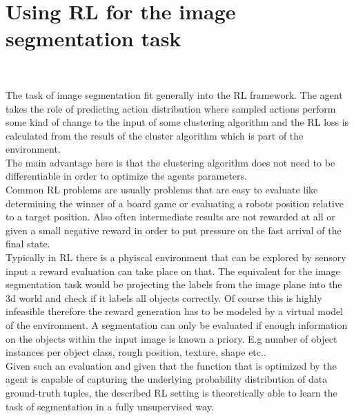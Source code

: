 \section{Using RL for the image segmentation task}~\label{sec:rl_for_seg}

The task of image segmentation fit generally into the RL framework. The agent takes the role of predicting action distribution where sampled actions perform some kind of change to the input of some clustering algorithm and the RL loss is calculated from the result of the cluster algorithm which is part of the environment. \\
The main advantage here is that the clustering algorithm does not need to be differentiable in order to optimize the agents parameters.\\
Common RL problems are usually problems that are easy to evaluate like determining the winner of a board game or evaluating a robots position relative to a target position. Also often intermediate results are not rewarded at all or given a small negative reward in order to put pressure on the fast arrival of the final state.\\
Typically in RL there is a phyiscal environment that can be explored by sensory input a reward evaluation can take place on that. The equivalent for the image segmentation task would be projecting the labels from the image plane into the 3d world and check if it labels all objects correctly. Of course this is highly infeasible therefore the reward generation has to be modeled by a virtual model of the environment. A segmentation can only be evaluated if enough information on the objects within the input image is known a priory. E.g number of object instances per object class, rough position, texture, shape etc.. \\
Given such an evaluation and given that the function that is optimized by the agent is capable of capturing the underlying probability distribution of data ground-truth tuples, the described RL setting is theoretically able to learn the task of segmentation in a fully unsupervised way.\\

